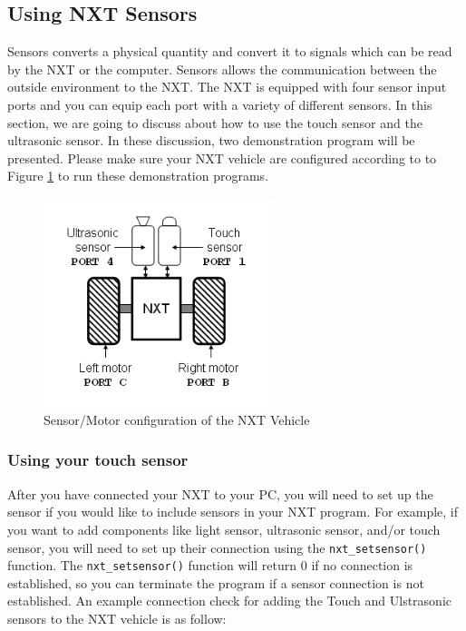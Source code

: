 \documentclass[12pt]{article}
\begin{document}
\subsection{Using NXT Sensors}
Sensors converts a physical quantity and convert it to signals which can be read by the NXT or the computer. 
Sensors allows the communication between the outside environment to the NXT. The NXT is equipped with four 
sensor input ports and you can equip each port with a variety of different sensors. In this section, we are 
going to discuss about how to use the touch sensor and the ultrasonic sensor. In these discussion, two 
demonstration program will be presented. Please make sure your NXT vehicle are configured according to to 
Figure \ref{fig_NXT_sensport} to run these demonstration programs.
\begin{figure}[h]
  \begin{center}
    \includegraphics[height=2.4in]{figure/mindstorm/NXT_auto.png}
    \caption{Sensor/Motor configuration of the NXT Vehicle \label{fig_NXT_sensport}}
  \end{center}
\end{figure}

\subsubsection{Using your touch sensor}
After you have connected your NXT to your PC, you will need to set up the sensor if you would like to include 
sensors in your NXT program. For example, if you want to add components like light sensor, ultrasonic sensor, 
and/or touch sensor, you will need to set up their connection using the \verb+nxt_setsensor()+ function. 
The \verb+nxt_setsensor()+ function will return 0 if no connection is established, so you can terminate the 
program if a sensor connection is not established. An example connection check for adding the Touch and 
Ulstrasonic sensors to the NXT vehicle is as follow:
\end{document}
